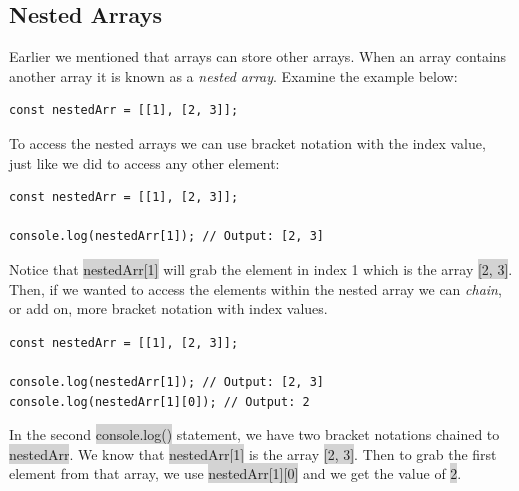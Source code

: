 \documentclass[11pt]{article}
\begin{document}
\subsection{Nested Arrays}
Earlier we mentioned that arrays can store other arrays. When an array contains another array it is known as a \textit{nested array}. Examine the example below:
\begin{lstlisting}
const nestedArr = [[1], [2, 3]];
\end{lstlisting}
To access the nested arrays we can use bracket notation with the index value, just like we did to access any other element:
\begin{lstlisting}
const nestedArr = [[1], [2, 3]];

console.log(nestedArr[1]); // Output: [2, 3]
\end{lstlisting}
Notice that \colorbox{lightgray}{nestedArr[1]} will grab the element in index 1 which is the array \colorbox{lightgray}{[2, 3]}. Then, if we wanted to access the elements within the nested array we can \textit{chain}, or add on, more bracket notation with index values. 
\begin{lstlisting}
const nestedArr = [[1], [2, 3]];

console.log(nestedArr[1]); // Output: [2, 3]
console.log(nestedArr[1][0]); // Output: 2
\end{lstlisting}
In the second \colorbox{lightgray}{console.log()} statement, we have two bracket notations chained to \colorbox{lightgray}{nestedArr}. We know that \colorbox{lightgray}{nestedArr[1]} is the array \colorbox{lightgray}{[2, 3]}. Then to grab the first element from that array, we use \colorbox{lightgray}{nestedArr[1][0]} and we get the value of \colorbox{lightgray}{2}.
\end{document}
